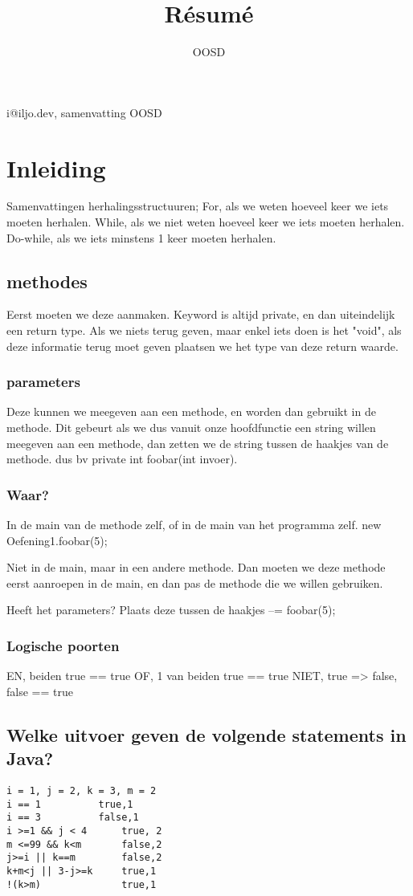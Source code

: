 \documentclass{article}
\makeatletter
\renewcommand{\maketitle}{
\begin{center}
{\huge\bfseries
\theauthor}

\vspace{.25em}
i@iljo.dev, samenvatting OOSD
\end{center}
}
\makeatother
\begin{document}
\title{R\'esum\'e}
\author{OOSD}
\maketitle

\section{Inleiding}
Samenvattingen herhalingsstructuuren; 
For, als we weten hoeveel keer we iets moeten herhalen.
While, als we niet weten hoeveel keer we iets moeten herhalen.
Do-while, als we iets minstens 1 keer moeten herhalen.

\subsection{methodes}
Eerst moeten we deze aanmaken. 
Keyword is altijd private, en dan uiteindelijk een return type. Als we niets terug geven, maar enkel iets doen is het "void", als deze informatie terug moet geven plaatsen we het type van deze return waarde.
\subsubsection{parameters}
Deze kunnen we meegeven aan een methode, en worden dan gebruikt in de methode.
Dit gebeurt als we dus vanuit onze hoofdfunctie een string willen meegeven aan een methode, dan zetten we de string tussen de haakjes van de methode. dus bv private int foobar(int invoer).

\subsubsection{Waar?}
In de main van de methode zelf, of in de main van het programma zelf. new Oefening1.foobar(5);

Niet in de main, maar in een andere methode. Dan moeten we deze methode eerst aanroepen in de main, en dan pas de methode die we willen gebruiken.

Heeft het parameters?
Plaats deze tussen de haakjes --= foobar(5);	
\subsubsection{Logische poorten}
EN, beiden true == true
OF, 1 van beiden true == true
NIET, true => false, false == true

\subsection{Welke uitvoer geven de volgende statements in Java?}
\begin{verbatim}
i = 1, j = 2, k = 3, m = 2
i == 1			true,1
i == 3			false,1
i >=1 && j < 4		true, 2
m <=99 && k<m		false,2
j>=i || k==m		false,2
k+m<j || 3-j>=k		true,1
!(k>m)	        	true,1
\end{verbatim}
\end{document}
